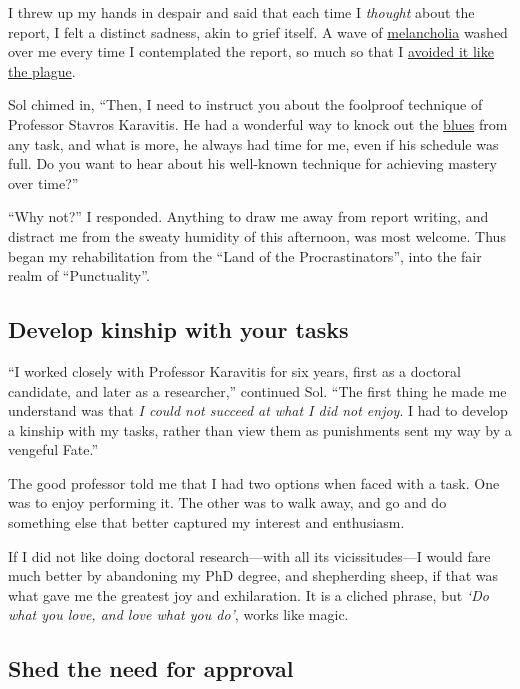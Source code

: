 \documentclass[
  a4paper,
]{article}
\begin{document}
I threw up my hands in despair and said that each time I \emph{thought}
about the report, I felt a distinct sadness, akin to grief itself. A
wave of
\href{https://dictionary.cambridge.org/dictionary/english/melancholia}{melancholia}
washed over me every time I contemplated the report, so much so that I
\href{https://www.merriam-webster.com/words-at-play/avoid-like-the-plague-origin}{avoided
it like the plague}.

Sol chimed in, ``Then, I need to instruct you about the foolproof
technique of Professor Stavros Karavitis. He had a wonderful way to
knock out the \href{https://www.vocabulary.com/dictionary/blues}{blues}
from any task, and what is more, he always had time for me, even if his
schedule was full. Do you want to hear about his well-known technique
for achieving mastery over time?''

``Why not?'' I responded. Anything to draw me away from report writing,
and distract me from the sweaty humidity of this afternoon, was most
welcome. Thus began my rehabilitation from the ``Land of the
Procrastinators'', into the fair realm of ``Punctuality''.

\subsection{Develop kinship with your
tasks}\label{develop-kinship-with-your-tasks}

``I worked closely with Professor Karavitis for six years, first as a
doctoral candidate, and later as a researcher,'' continued Sol. ``The
first thing he made me understand was that \emph{I could not succeed at
what I did not enjoy}. I had to develop a kinship with my tasks, rather
than view them as punishments sent my way by a vengeful Fate.''

The good professor told me that I had two options when faced with a
task. One was to enjoy performing it. The other was to walk away, and go
and do something else that better captured my interest and enthusiasm.

If I did not like doing doctoral research---with all its
vicissitudes---I would fare much better by abandoning my PhD degree, and
shepherding sheep, if that was what gave me the greatest joy and
exhilaration. It is a cliched phrase, but \emph{`Do what you love, and
love what you do'}, works like magic.

\subsection{Shed the need for
approval}\label{shed-the-need-for-approval}
\end{document}
